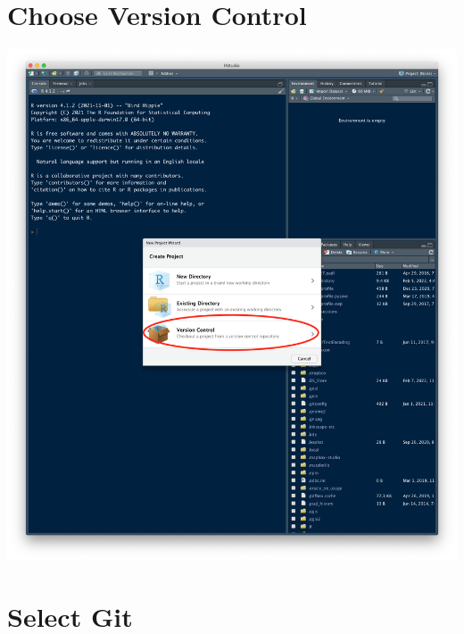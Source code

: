 \documentclass[
  12pt,
]{book}
\begin{document}
\hypertarget{choose-version-control}{%
\section{Choose Version Control}\label{choose-version-control}}

\includegraphics{images/clone_step3.png}

\hypertarget{select-git}{%
\section{Select Git}\label{select-git}}
\end{document}
